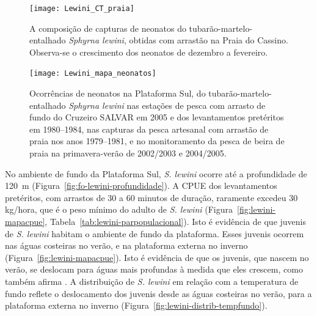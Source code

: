 \documentclass[a4paper,11pt,twoside,showtrims,onecolumn,openright,final]{memoir}
\begin{document}
%
%

\begin{figure}
\begin{center}
\texttt{[image: Lewini\_CT\_praia]}
\end{center}
\caption[Composição de capturas de neonatos do tubarão-martelo-entalhado   \emph{Sphyrna lewini} no arrastão de praia]
	{A composição de capturas de neonatos do tubarão-martelo-entalhado   \emph{Sphyrna lewini}, 
         obtidas com arrastão na Praia do Cassino. Observa-se o crescimento dos neonatos de dezembro a fevereiro.}
\label{fig:lewini-ct-neonatos}
\end{figure}



%
%

\begin{figure}
\begin{center}
\texttt{[image: Lewini\_mapa\_neonatos]}
\end{center}
\caption[Ocorrências de neonatos do tubarão-martelo-entalhado  \emph{Sphyrna lewini} na Plataforma Sul]
	{Ocorrências de neonatos na Plataforma Sul, do tubarão-martelo-entalhado  \emph{Sphyrna lewini}
         nas estações de pesca com arrasto de fundo do Cruzeiro SALVAR em 2005 e 
         dos levantamentos pretéritos em 1980--1984, nas capturas da pesca artesanal 
         com arrastão de praia nos anos 1979--1981, e no monitoramento da pesca de beira de praia
         na primavera-verão de 2002/2003 e 2004/2005.}
\label{fig:lewini-mapa-neonatos}
\end{figure}


No ambiente de fundo da Plataforma Sul, \emph{S. lewini}  ocorre até a profundidade de 120~m (Figura~\ref{fig:fo-lewini-profundidade}).
A CPUE dos levantamentos pretéritos, com arrastos de 30 a 60 minutos de duração,  raramente 
excedeu 30 kg/hora, que é o peso mínimo do adulto de \emph{S. lewini}  (Figura~\ref{fig:lewini-mapacpue}, Tabela~\ref{tab:lewini-parpopulacional}). 
Isto é evidência de que juvenis de \emph{S. lewini}  habitam o ambiente de fundo da plataforma. 
Esses juvenis ocorrem nas águas costeiras no verão, e na plataforma externa no inverno (Figura~\ref{fig:lewini-mapacpue}). 
Isto é evidência de que os juvenis, que nascem no verão,  se deslocam para águas mais profundas à medida 
que eles crescem, como também afirma \citet{COMPAGNO1984B}. %
A distribuição de \emph{S. lewini}  em relação com 
a temperatura de fundo reflete o deslocamento dos juvenis desde as águas costeiras no verão, para 
a plataforma externa no inverno (Figura~\ref{fig:lewini-distrib-tempfundo}).
\end{document}
